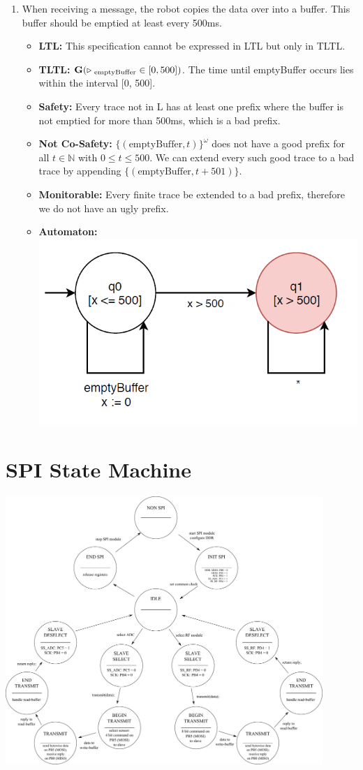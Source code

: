 \documentclass[12pt]{article}
\begin{document}
\begin{enumerate}
\item When receiving a message, the robot copies the data over into a buffer. This buffer should be emptied at least every 500ms.
	\begin{itemize}
		\item \textbf{LTL:} This specification cannot be expressed in LTL but only in TLTL.
		\item \textbf{TLTL:} $\mathbf{G}(\triangleright \textsubscript{ emptyBuffer} \in [0, 500])$. The time until emptyBuffer occurs lies within the interval [0, 500].
		\item \textbf{Safety:} Every trace not in L has at least one prefix where the buffer is not emptied for more than 500ms, which is a bad prefix.
		\item \textbf{Not Co-Safety:} $\{( \text{emptyBuffer}, t)\}^ {\omega}$ does not have a good prefix for all $t \in \mathbb{N}$ with $0 \leq t \leq 500$. We can extend every such good trace to a bad trace by appending $\{( \text{emptyBuffer}, t + 501)\}$.
		\item \textbf{Monitorable:} Every finite trace be extended to a bad prefix, therefore we do not have an ugly prefix.
		\item \textbf{Automaton:} \\
			\includegraphics[scale = 0.5]{images/bufferAutomaton}
	\end{itemize}				

\end{enumerate}

\section*{SPI State Machine}

\includegraphics[width = 0.9\textwidth]{images/spi_state_machine_extended.pdf}
\end{document}
